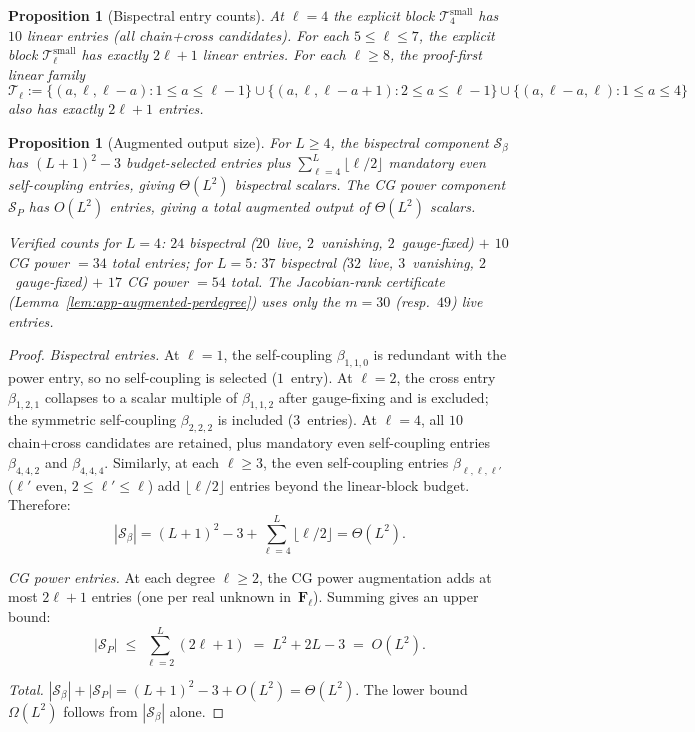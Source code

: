 \documentclass{article}
\newtheorem{proposition}[theorem]{Proposition}
\theoremstyle{definition}
\theoremstyle{remark}
\theoremstyle{definition}
\begin{document}
\begin{proposition}[Bispectral entry counts]\label{prop:app-entry-counts}
At $\ell = 4$ the explicit block $\mathcal{T}^{\mathrm{small}}_4$ has
$10$ linear entries (all chain+cross candidates).
For each $5 \le \ell \le 7$, the explicit block
$\mathcal{T}^{\mathrm{small}}_\ell$ has exactly $2\ell+1$ linear
entries. For each $\ell \ge 8$, the proof-first linear family
\[
  \mathcal{T}_\ell
  := \{(a,\ell,\ell-a) : 1 \le a \le \ell-1\}
     \cup \{(a,\ell,\ell-a+1) : 2 \le a \le \ell-1\}
     \cup \{(a,\ell-a,\ell) : 1 \le a \le 4\}
\]
also has exactly $2\ell+1$ entries.
\end{proposition}

\begin{proposition}[Augmented output size]\label{prop:app-output-size}
For $L \ge 4$, the bispectral component $\mathcal{S}_\beta$
has $(L{+}1)^2 - 3$ budget-selected entries
plus $\sum_{\ell=4}^{L}\lfloor\ell/2\rfloor$ mandatory
even self-coupling entries, giving $\Theta(L^2)$ bispectral
scalars.
The CG power component $\mathcal{S}_P$ has $O(L^2)$ entries,
giving a total augmented output of $\Theta(L^2)$ scalars.

Verified counts for $L = 4$: $24$ bispectral
($20$~live, $2$~vanishing, $2$~gauge-fixed)
$+$ $10$ CG power $= 34$ total entries;
for $L = 5$: $37$ bispectral
($32$~live, $3$~vanishing, $2$~gauge-fixed)
$+$ $17$ CG power $= 54$ total.
The Jacobian-rank certificate
(Lemma~\ref{lem:app-augmented-perdegree}) uses only the
$m = 30$ (resp.\ $49$) live entries.
\end{proposition}
\begin{proof}
\emph{Bispectral entries.}
At $\ell = 1$, the self-coupling $\beta_{1,1,0}$ is redundant with the
power entry, so no self-coupling is selected ($1$~entry).
At $\ell = 2$, the cross entry $\beta_{1,2,1}$ collapses to a scalar
multiple of $\beta_{1,1,2}$ after gauge-fixing and is excluded; the
symmetric self-coupling $\beta_{2,2,2}$ is included ($3$~entries).
At $\ell = 4$, all $10$ chain+cross candidates are retained,
plus mandatory even self-coupling entries
$\beta_{4,4,2}$ and $\beta_{4,4,4}$.
Similarly, at each $\ell \ge 3$, the even self-coupling entries
$\beta_{\ell,\ell,\ell'}$ ($\ell'$ even, $2 \le \ell' \le \ell$)
add $\lfloor\ell/2\rfloor$ entries beyond the linear-block
budget.  Therefore:
\[
  |\mathcal{S}_\beta|
  = (L{+}1)^2 - 3 + \sum_{\ell=4}^{L}\lfloor\ell/2\rfloor
  = \Theta(L^2).
\]

\emph{CG power entries.}
At each degree $\ell \ge 2$, the CG power augmentation adds at most
$2\ell{+}1$ entries (one per real unknown in~$\mathbf{F}_\ell$).
Summing gives an upper bound:
\[
  |\mathcal{S}_P| \;\le\; \sum_{\ell=2}^{L} (2\ell{+}1)
  \;=\; L^2 + 2L - 3 \;=\; O(L^2).
\]

\emph{Total.}
$|\mathcal{S}_\beta| + |\mathcal{S}_P|
= (L{+}1)^2 - 3 + O(L^2) = \Theta(L^2)$.
The lower bound $\Omega(L^2)$ follows from $|\mathcal{S}_\beta|$ alone.
\end{proof}
\end{document}
